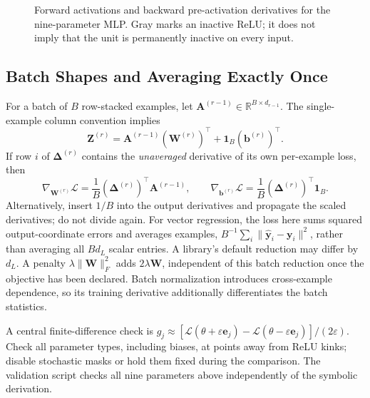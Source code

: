 \documentclass[11pt,twoside]{article}
\numberwithin{equation}{section}
\newcommand{\R}{\mathbb{R}}
\newcommand{\vect}[1]{\bm{#1}}
\newcommand{\mat}[1]{\bm{#1}}
\newcommand{\Loss}{\mathcal{L}}
\theoremstyle{plain}
\theoremstyle{definition}
\theoremstyle{remark}
\begin{document}
\begin{figure}[H]
\centering
{}
\caption{Forward activations and backward pre-activation derivatives for the nine-parameter MLP. Gray marks an inactive ReLU; it does not imply that the unit is permanently inactive on every input.}
\end{figure}

\subsection{Batch Shapes and Averaging Exactly Once}
\label{sec:batch-reduction}
For a batch of $B$ row-stacked examples, let $\mat A^{(r-1)}\in\R^{B\times d_{r-1}}$. The single-example column convention implies
\[
\mat Z^{(r)}=\mat A^{(r-1)}(\mat W^{(r)})^\top+\vect1_B(\vect b^{(r)})^\top.
\]
If row $i$ of $\mat\Delta^{(r)}$ contains the \emph{unaveraged} derivative of its own per-example loss, then
\[
\nabla_{\mat W^{(r)}}\Loss=\frac1B(\mat\Delta^{(r)})^\top\mat A^{(r-1)},\qquad
\nabla_{\vect b^{(r)}}\Loss=\frac1B(\mat\Delta^{(r)})^\top\vect1_B.
\]
Alternatively, insert $1/B$ into the output derivatives and propagate the scaled derivatives; do not divide again. For vector regression, the loss here sums squared output-coordinate errors and averages examples, $B^{-1}\sum_i\|\hat{\vect y}_i-\vect y_i\|^2$, rather than averaging all $B d_L$ scalar entries. A library's default reduction may differ by $d_L$. A penalty $\lambda\|\mat W\|_F^2$ adds $2\lambda\mat W$, independent of this batch reduction once the objective has been declared. Batch normalization introduces cross-example dependence, so its training derivative additionally differentiates the batch statistics.

A central finite-difference check is $g_j\approx[\Loss(\theta+\varepsilon\vect e_j)-\Loss(\theta-\varepsilon\vect e_j)]/(2\varepsilon)$. Check all parameter types, including biases, at points away from ReLU kinks; disable stochastic masks or hold them fixed during the comparison. The validation script checks all nine parameters above independently of the symbolic derivation.
\end{document}
